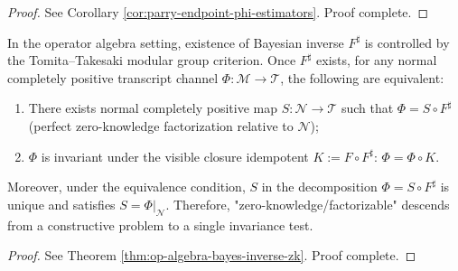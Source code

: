 \begin{proof}[Proof]
See Corollary \ref{cor:parry-endpoint-phi-estimators}. Proof complete.
\end{proof}
\begin{conclusion}\label{con:xi-terminal-bayesian-inverse-zk-factorization-invariance}
In the operator algebra setting, existence of Bayesian inverse \(F^\sharp\) is controlled by the Tomita--Takesaki modular group criterion.
Once \(F^\sharp\) exists, for any normal completely positive transcript channel \(\Phi:\mathcal{M}\to\mathcal{T}\), the following are equivalent:
\begin{enumerate}
  \item There exists normal completely positive map \(S:\mathcal{N}\to\mathcal{T}\) such that \(\Phi=S\circ F^\sharp\) (perfect zero-knowledge factorization relative to \(\mathcal{N}\));
  \item \(\Phi\) is invariant under the visible closure idempotent \(K:=F\circ F^\sharp\): \(\Phi=\Phi\circ K\).
\end{enumerate}
Moreover, under the equivalence condition, \(S\) in the decomposition \(\Phi=S\circ F^\sharp\) is unique and satisfies \(S=\Phi|_{\mathcal{N}}\).
Therefore, "zero-knowledge/factorizable" descends from a constructive problem to a single invariance test.
\end{conclusion}
\begin{proof}[Proof]
See Theorem \ref{thm:op-algebra-bayes-inverse-zk}. Proof complete.
\end{proof}



